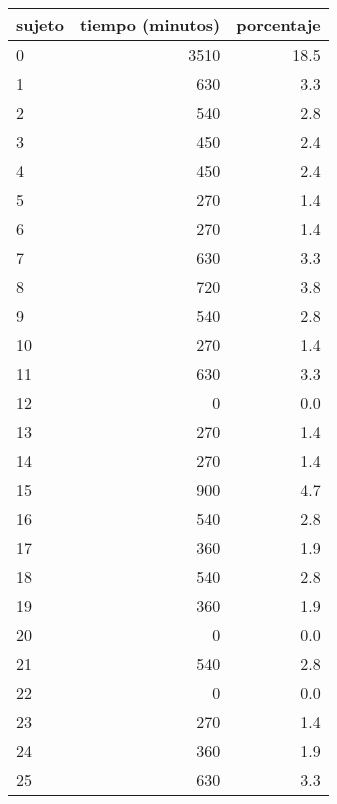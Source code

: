 \documentclass[spanish]{article}
\begin{document}
\begin{table}[h!]
\begin{center}
\begin{tabular}{|l|r|r|}
\hline
sujeto & tiempo (minutos) & porcentaje    \\ \hline
     0 &             3510 &           18.5\\ \hline
     1 &              630 &            3.3\\ \hline
     2 &              540 &            2.8\\ \hline
     3 &              450 &            2.4\\ \hline
     4 &              450 &            2.4\\ \hline
     5 &              270 &            1.4\\ \hline
     6 &              270 &            1.4\\ \hline
     7 &              630 &            3.3\\ \hline
     8 &              720 &            3.8\\ \hline
     9 &              540 &            2.8\\ \hline
    10 &              270 &            1.4\\ \hline
    11 &              630 &            3.3\\ \hline
    12 &                0 &            0.0\\ \hline
    13 &              270 &            1.4\\ \hline
    14 &              270 &            1.4\\ \hline
    15 &              900 &            4.7\\ \hline
    16 &              540 &            2.8\\ \hline
    17 &              360 &            1.9\\ \hline
    18 &              540 &            2.8\\ \hline
    19 &              360 &            1.9\\ \hline
    20 &                0 &            0.0\\ \hline
    21 &              540 &            2.8\\ \hline
    22 &                0 &            0.0\\ \hline
    23 &              270 &            1.4\\ \hline
    24 &              360 &            1.9\\ \hline
    25 &              630 &            3.3\\ \hline

\end{tabular}
\end{center}
\end{table}
\end{document}
